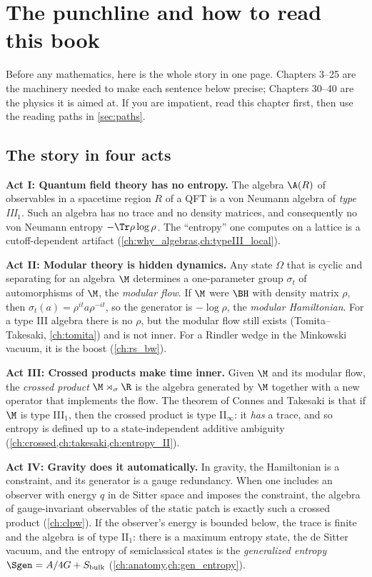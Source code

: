 \chapter{The punchline and how to read this book}\label{ch:punchline}

\begin{physmotiv}
Before any mathematics, here is the whole story in one page. Chapters 3--25 are the machinery needed to make each sentence below precise; Chapters 30--40 are the physics it is aimed at. If you are impatient, read this chapter first, then use the reading paths in \cref{sec:paths}.
\end{physmotiv}

\section{The story in four acts}

\textbf{Act I: Quantum field theory has no entropy.} The algebra $\A(R)$ of observables in a spacetime region $R$ of a QFT is a von Neumann algebra of \emph{type III$_1$}. Such an algebra has no trace and no density matrices, and consequently no von Neumann entropy $-\Tr\rho\log\rho$. The ``entropy'' one computes on a lattice is a cutoff-dependent artifact (\cref{ch:why_algebras,ch:typeIII_local}).

\textbf{Act II: Modular theory is hidden dynamics.} Any state $\Omega$ that is cyclic and separating for an algebra $\M$ determines a one-parameter group $\sigma_t$ of automorphisms of $\M$, the \emph{modular flow}. If $\M$ were $\BH$ with density matrix $\rho$, then $\sigma_t(a)=\rho^{it}a\rho^{-it}$, so the generator is $-\log\rho$, the \emph{modular Hamiltonian}. For a type III algebra there is no $\rho$, but the modular flow still exists (Tomita--Takesaki, \cref{ch:tomita}) and is not inner. For a Rindler wedge in the Minkowski vacuum, it is the boost (\cref{ch:rs_bw}).

\textbf{Act III: Crossed products make time inner.} Given $\M$ and its modular flow, the \emph{crossed product} $\M\rtimes_\sigma\R$ is the algebra generated by $\M$ together with a new operator that implements the flow. The theorem of Connes and Takesaki is that if $\M$ is type III$_1$, then the crossed product is type II$_\infty$: it \emph{has} a trace, and so entropy is defined up to a state-independent additive ambiguity (\cref{ch:crossed,ch:takesaki,ch:entropy_II}).

\textbf{Act IV: Gravity does it automatically.} In gravity, the Hamiltonian is a constraint, and its generator is a gauge redundancy. When one includes an observer with energy $q$ in de Sitter space and imposes the constraint, the algebra of gauge-invariant observables of the static patch is exactly such a crossed product (\cref{ch:clpw}). If the observer's energy is bounded below, the trace is finite and the algebra is of type II$_1$: there is a maximum entropy state, the de Sitter vacuum, and the entropy of semiclassical states is the \emph{generalized entropy} $\Sgen=A/4G+S_{\rm bulk}$ (\cref{ch:anatomy,ch:gen_entropy}).

